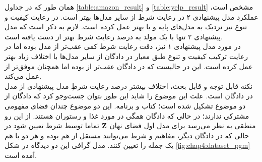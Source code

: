 همان طور که در جداول \ref{table:amazon_result} و \ref{table:yelp_result} مشخص است، عملکرد مدل پیشنهادی ۲ در رعایت شرط از سایر مدل‌ها بهتر است. در رعایت کیفیت و تنوع نیز نزدیک به مدل‌های پایه و یا بهتر عمل کرده است. لازم به ذکر است که مدل پیشنهادی ۲ تنها با یک مولد به درصد رعایت شرط بهتر از \sentigan{} دست یافته است.
\\
در مورد مدل پیشنهادی ۱ نیز، دقت رعایت شرط کمی عقب‌تر از مدل \towardctg{} بوده اما در رعایت ترکیب کیفیت و تنوع طبق معیار \jaccard{} در دادگان \amazon{} از سایر مدل‌ها با اختلاف زیاد بهتر عمل کرده است. این در حالیست که در دادگان \yelp{} عقب‌تر از \towardctg{} بوده اما همچنان موفق‌تر از \sentigan{} عمل می‌کند.
\\
\iffalse
نکته قابل توجه و قابل بحث، اختلاف بیشتر درصد رعایت شرطِ مدل پیشنهادی از مدل \towardctg{} در دادگان \amazon{} است. علت این موضوع را شاید این طور بتوان جست‌وجو کرد که دادگان \amazon{} از دو موضوع تشکیل شده است؛ کتاب و برنامه. این دو موضوع چندان فضای مفهومی مشترکی ندارند؛ در حالی که دادگان \yelp{} همگی در مورد غذا و رستوران هستند. از این رو منطقی به نظر می‌رسد برای مدل اول فضای نهان ${\bf Z}$ تماما توسط شرط تعیین شود در حالی که در دادگان دیگر، مفاهیم و شرط می‌توانند مستقل از هم بوده و هر دو با هم یک جمله را تعیین کنند. مدل گرافی این دو دیدگاه در شکل \ref{fig:chap4:dataset_pgm} آمده است.
